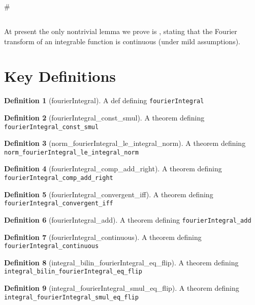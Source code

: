 \documentclass{article}
\theoremstyle{definition}
\newtheorem{definition}{Definition}
\begin{document}
#\subsection{\1}

At present the only nontrivial lemma we prove is \texttt{\1}, stating that the
Fourier transform of an integrable function is continuous (under mild assumptions).

\section{Key Definitions}
\begin{definition}[fourierIntegral]
A def defining \texttt{fourierIntegral}
\end{definition}

\begin{definition}[fourierIntegral_const_smul]
A theorem defining \texttt{fourierIntegral_const_smul}
\end{definition}

\begin{definition}[norm_fourierIntegral_le_integral_norm]
A theorem defining \texttt{norm_fourierIntegral_le_integral_norm}
\end{definition}

\begin{definition}[fourierIntegral_comp_add_right]
A theorem defining \texttt{fourierIntegral_comp_add_right}
\end{definition}

\begin{definition}[fourierIntegral_convergent_iff]
A theorem defining \texttt{fourierIntegral_convergent_iff}
\end{definition}

\begin{definition}[fourierIntegral_add]
A theorem defining \texttt{fourierIntegral_add}
\end{definition}

\begin{definition}[fourierIntegral_continuous]
A theorem defining \texttt{fourierIntegral_continuous}
\end{definition}

\begin{definition}[integral_bilin_fourierIntegral_eq_flip]
A theorem defining \texttt{integral_bilin_fourierIntegral_eq_flip}
\end{definition}

\begin{definition}[integral_fourierIntegral_smul_eq_flip]
A theorem defining \texttt{integral_fourierIntegral_smul_eq_flip}
\end{definition}
\end{document}
